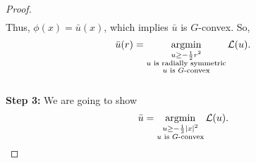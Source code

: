 \begin{proof}
\begin{equation*}
\begin{split}
	\end{split}
	\end{equation*}
	Thus, $\phi(x) = \bar{u}(x)$, which implies $\bar{u}$ is $G$-convex. So,
	\begin{equation*}
	\bar{u}(r)= \argmin\limits_{\substack{u\ge -\frac{1}{2}r^2 \\ u \text{ is radially symmetric} \\ u \text{ is $G$-convex}}} \mathcal{L}(u).
	\end{equation*}\\
	
	{\bf Step 3:} We are going to show
	\begin{equation*}
	\bar{u}=\argmin\limits_{\substack{u\ge -\frac{1}{2}|x|^2 \\ u \text{ is $G$-convex}}} \mathcal{L}(u) .
	\end{equation*}


\end{proof}
